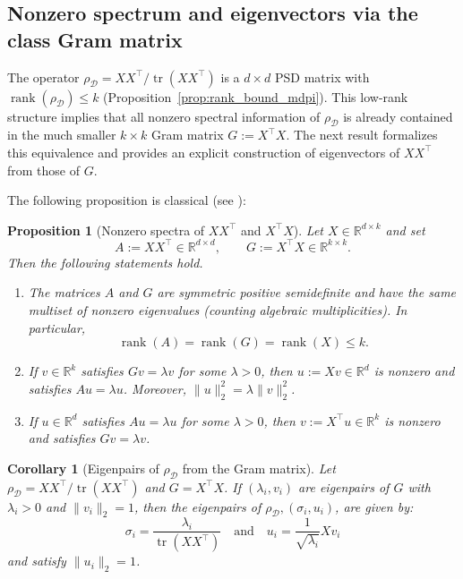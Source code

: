\documentclass[preprint,11pt]{elsarticle}
\newtheorem{Proposition}[Theorem]{Proposition}
\newtheorem{Corollary}[Theorem]{Corollary}
\newcommand{\tr}{\operatorname{tr}}
\newcommand{\rank}{\operatorname{rank}}
\newcommand{\R}{\mathbb{R}}
\begin{document}

\subsection{Nonzero spectrum and eigenvectors via the class Gram matrix}
\label{subsec:gram_equivalence}

The operator $\rho_{\mathcal D}=XX^\top/\tr(XX^\top)$ is a $d\times d$ PSD matrix with $\rank(\rho_{\mathcal D})\le k$
(Proposition~\ref{prop:rank_bound_mdpi}). This low-rank structure implies that all nonzero spectral information of $\rho_{\mathcal D}$
is already contained in the much smaller $k\times k$ Gram matrix $G:=X^\top X$. The next result formalizes this equivalence and
provides an explicit construction of eigenvectors of $XX^\top$ from those of $G$.

The following proposition is classical (see \cite{Strang2006}):

\begin{Proposition}[Nonzero spectra of $XX^\top$ and $X^\top X$]
    \label{prop:gram_spectrum_equivalence}
    Let $X\in\R^{d\times k}$ and set
    \[
    A:=XX^\top\in\R^{d\times d},\qquad G:=X^\top X\in\R^{k\times k}.
    \]
    Then the following statements hold.
    \begin{enumerate}
    \item The matrices $A$ and $G$ are symmetric positive semidefinite and have the same multiset of nonzero eigenvalues (counting algebraic multiplicities). In particular,
    \[
    \rank(A)=\rank(G)=\rank(X)\le k.
    \]
    \item If $v\in\R^k$ satisfies $Gv=\lambda v$ for some $\lambda>0$, then $u:=Xv\in\R^d$ is nonzero and satisfies $Au=\lambda u$.
    Moreover, $\|u\|_2^2=\lambda\|v\|_2^2$.
    \item If $u\in\R^d$ satisfies $Au=\lambda u$ for some $\lambda>0$, then $v:=X^\top u\in\R^k$ is nonzero and satisfies $Gv=\lambda v$.
    \end{enumerate}
\end{Proposition}

\begin{Corollary}[Eigenpairs of $\rho_{\mathcal D}$ from the Gram matrix]
\label{cor:rho_from_gram}
Let $\rho_{\mathcal D}=XX^\top/\tr(XX^\top)$ and $G=X^\top X$.
If $(\lambda_i,v_i)$ are eigenpairs of $G$ with $\lambda_i>0$ and $\|v_i\|_2=1$, then the eigenpairs of $\rho_\mathcal{D}, (\sigma_i, u_i)$, are given by:
\[
\sigma_i=\frac{\lambda_i}{\tr(XX^\top)}
\quad\text{and}\quad
u_i=\frac{1}{\sqrt{\lambda_i}}Xv_i
\]
and satisfy $\|u_i\|_2=1$.
\end{Corollary}
\end{document}
